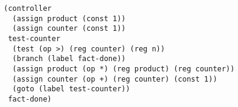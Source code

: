 \documentclass[a4paper,12pt]{article}
\begin{document}
\begin{lstlisting}
(controller
  (assign product (const 1))
  (assign counter (const 1))
 test-counter
  (test (op >) (reg counter) (reg n))
  (branch (label fact-done))
  (assign product (op *) (reg product) (reg counter))
  (assign counter (op +) (reg counter) (const 1))
  (goto (label test-counter))
 fact-done)
\end{lstlisting}
\end{document}
